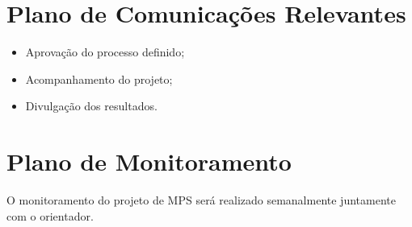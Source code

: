   

\section*{Plano de Comunicações Relevantes}

	\begin{itemize}
		\item Aprovação do processo definido;
		\item Acompanhamento do projeto;
		\item Divulgação dos resultados.

	\end{itemize}

\section*{Plano de Monitoramento}
	
	O monitoramento do projeto de MPS será realizado semanalmente juntamente com o orientador.

